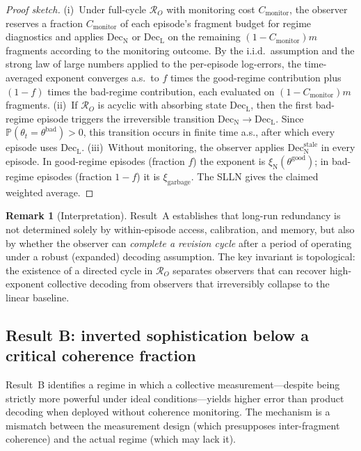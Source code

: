 \documentclass[11pt]{article}
\newcommand{\cR}{\mathcal{R}}
\newcommand{\Prob}{\mathbb{P}}
\newcommand{\1}{\mathbf{1}}
\newcommand{\QCBdist}{\xi}
\theoremstyle{definition}
\newtheorem{remark}{Remark}
\theoremstyle{plain}
\begin{document}
\begin{proof}[Proof sketch]
(i)~Under full-cycle $\cR_O$ with monitoring cost $C_{\mathrm{monitor}}$, the observer reserves a fraction $C_{\mathrm{monitor}}$ of each episode's fragment budget for regime diagnostics and applies $\mathrm{Dec}_{\mathrm{N}}$ or $\mathrm{Dec}_{\mathrm{L}}$ on the remaining $(1-C_{\mathrm{monitor}})m$ fragments according to the monitoring outcome.
By the i.i.d.\ assumption and the strong law of large numbers applied to the per-episode log-errors, the time-averaged exponent converges a.s.\ to $f$ times the good-regime contribution plus $(1-f)$ times the bad-regime contribution, each evaluated on $(1-C_{\mathrm{monitor}})m$ fragments.
(ii)~If $\cR_O$ is acyclic with absorbing state $\mathrm{Dec}_{\mathrm{L}}$, then the first bad-regime episode triggers the irreversible transition $\mathrm{Dec}_{\mathrm{N}}\to\mathrm{Dec}_{\mathrm{L}}$.
Since $\Prob(\theta_t=\theta^{\mathrm{bad}})>0$, this transition occurs in finite time a.s., after which every episode uses $\mathrm{Dec}_{\mathrm{L}}$.
(iii)~Without monitoring, the observer applies $\mathrm{Dec}_{\mathrm{N}}^{\mathrm{stale}}$ in every episode.
In good-regime episodes (fraction $f$) the exponent is $\QCBdist_{\mathrm{N}}(\theta^{\mathrm{good}})$; in bad-regime episodes (fraction $1-f$) it is $\QCBdist_{\mathrm{garbage}}$.
The SLLN gives the claimed weighted average.
\end{proof}

\begin{remark}[Interpretation]
Result~A establishes that long-run redundancy is not determined solely by within-episode access, calibration, and memory, but also by whether the observer can \emph{complete a revision cycle} after a period of operating under a robust (expanded) decoding assumption.
The key invariant is topological: the existence of a directed cycle in $\cR_O$ separates observers that can recover high-exponent collective decoding from observers that irreversibly collapse to the linear baseline.
\end{remark}

\subsection{Result B: inverted sophistication below a critical coherence fraction}

Result~B identifies a regime in which a collective measurement---despite being strictly more powerful under ideal conditions---yields higher error than product decoding when deployed without coherence monitoring.  The mechanism is a mismatch between the measurement design (which presupposes inter-fragment coherence) and the actual regime (which may lack it).
\end{document}
